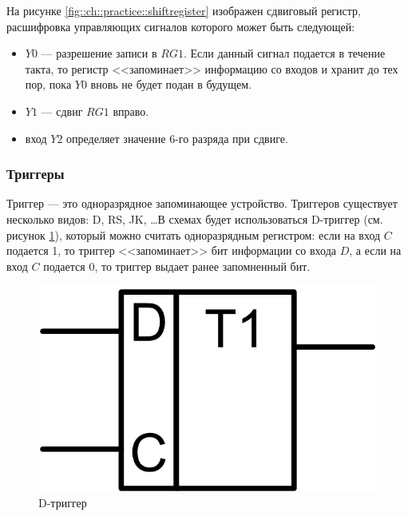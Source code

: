 На рисунке \ref{fig::ch::practice::shiftregister} изображен сдвиговый регистр, расшифровка управляющих сигналов которого может быть следующей:
\begin{itemize}
    \item $Y0$ --- разрешение записи в $RG1$. Если данный сигнал подается в течение такта, то регистр <<запоминает>> информацию со входов и хранит до тех пор, пока $Y0$ вновь не будет подан в будущем.

    \item $Y1$ --- сдвиг $RG1$ вправо.
    
    \item вход $Y2$ определяет значение $6$-го разряда при сдвиге.
\end{itemize}


\subsubsection{Триггеры}

Триггер --- это одноразрядное запоминающее устройство. Триггеров существует несколько видов: D, RS, JK, \ldots В схемах будет использоваться D-триггер (см. рисунок \ref{fig::ch::practice::dtrigger}), который можно считать одноразрядным регистром: если на вход $C$ подается 1, то триггер <<запоминает>> бит информации со входа $D$, а если на вход $C$ подается 0, то триггер выдает ранее запомненный бит.

\begin{figure}[!ht]
    \centering
    \includegraphics{fig/dtrigger}
    \caption{D-триггер}
    \label{fig::ch::practice::dtrigger}
\end{figure}
